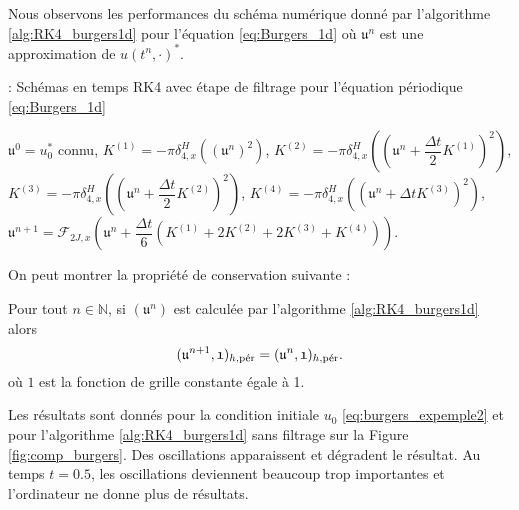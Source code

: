 Nous observons les performances du schéma numérique donné par l'algorithme \ref{alg:RK4_burgers1d} pour l'équation \eqref{eq:Burgers_1d} où $\mathfrak{u}^n$ est une approximation de $u(t^n, \cdot)^*$.

\begin{center}
\begin{minipage}[H]{12cm}
  \begin{algorithm}[H]
    \caption{: Schémas en temps RK4 avec étape de filtrage pour l'équation périodique \eqref{eq:Burgers_1d}}\label{alg:RK4_burgers1d}
    \begin{algorithmic}[1]
    \State $\mathfrak{u}^0 = u_0^*$ connu,
             \State  $K^{(1)} = - \pi \delta_{4,x}^H \left(\left( \mathfrak{u}^n \right)^2\right)$,
             \State  $K^{(2)} = - \pi \delta_{4,x}^H \left(\left( \mathfrak{u}^n + \dfrac{\Delta t}{2} K^{(1)}\right)^2\right)$,
             \State  $K^{(3)} = - \pi \delta_{4,x}^H \left(\left( \mathfrak{u}^n + \dfrac{\Delta t}{2} K^{(2)}\right)^2\right)$,
             \State  $K^{(4)} = - \pi \delta_{4,x}^H \left(\left( \mathfrak{u}^n + \Delta t K^{(3)}\right)^2\right)$,  
             \State  $\mathfrak{u}^{n+1} = \mathcal{F}_{2J,x}\left( \mathfrak{u}^n  + \dfrac{\Delta t}{6} \left( K^{(1)} + 2 K^{(2)} + 2 K^{(3)} + K^{(4)} \right) \right)$.
            \EndFor
    \end{algorithmic}
    \end{algorithm}
\end{minipage}
\end{center}

On peut montrer la propriété de conservation suivante :
\begin{proposition}
Pour tout $n \in \mathbb{N}$, si $(\mathfrak{u}^n)$ est calculée par l'algorithme \ref{alg:RK4_burgers1d} alors
\begin{equation}
(\mathfrak{u}^{n+1}, \mathfrak{1})_{h,\per} = (\mathfrak{u}^n, \mathfrak{1})_{h,\per}.
\end{equation}
où $\mathfrak{1}$ est la fonction de grille constante égale à 1.
\end{proposition}

Les résultats sont donnés pour la condition initiale $u_0$ \eqref{eq:burgers_expemple2} et pour l'algorithme \ref{alg:RK4_burgers1d} sans filtrage sur la Figure \ref{fig:comp_burgers}. Des oscillations apparaissent et dégradent le résultat. Au temps $t=0.5$, les oscillations deviennent beaucoup trop importantes et l'ordinateur ne donne plus de résultats.

